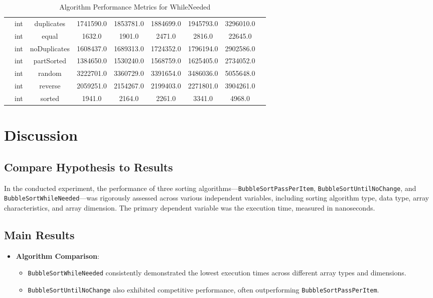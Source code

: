 \documentclass{article}
\begin{document}
\begin{table}[H]
\begin{tabular}{|c|c|c|c|c|c|c|c|c|}
        & int & duplicates & 1741590.0 & 1853781.0 & 1884699.0 & 1945793.0 & 3296010.0 \\
        & int & equal & 1632.0 & 1901.0 & 2471.0 & 2816.0 & 22645.0 \\
        & int & noDuplicates & 1608437.0 & 1689313.0 & 1724352.0 & 1796194.0 & 2902586.0 \\
        & int & partSorted & 1384650.0 & 1530240.0 & 1568759.0 & 1625405.0 & 2734052.0 \\
        & int & random & 3222701.0 & 3360729.0 & 3391654.0 & 3486036.0 & 5055648.0 \\
        & int & reverse & 2059251.0 & 2154267.0 & 2199403.0 & 2271801.0 & 3904261.0 \\
        & int & sorted & 1941.0 & 2164.0 & 2261.0 & 3341.0 & 4968.0 \\
        \bottomrule
    \end{tabular}
    \caption{Algorithm Performance Metrics for WhileNeeded}
\end{table}

\section{Discussion}
\subsection{Compare Hypothesis to Results}
\begin{tcolorbox}[title=Experiment Overview, colback=white, colframe=black, arc=0pt, outer arc=0pt]
    In the conducted experiment, the performance of three sorting algorithms—\texttt{BubbleSortPassPerItem}, \texttt{BubbleSortUntilNoChange}, and \texttt{BubbleSortWhileNeeded}—was rigorously assessed across various independent variables, including sorting algorithm type, data type, array characteristics, and array dimension. The primary dependent variable was the execution time, measured in nanoseconds.
\end{tcolorbox}

\subsection*{Main Results}
\begin{itemize}
 \item \textbf{Algorithm Comparison}:
        \begin{itemize}
          \item \texttt{BubbleSortWhileNeeded} consistently demonstrated the lowest execution times across different array types and dimensions.
          \item \texttt{BubbleSortUntilNoChange} also exhibited competitive performance, often outperforming \texttt{BubbleSortPassPerItem}.
        \end{itemize}
\end{itemize}
\end{document}
